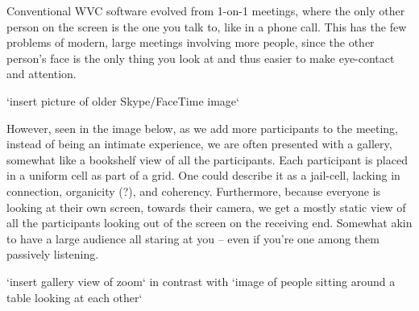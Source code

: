 \documentclass[10pt,letterpaper]{article}
\begin{document}
Conventional WVC software evolved from 1-on-1 meetings, where the only other person on the screen is the one you talk to, like in a phone call. This has the few problems of modern, large meetings involving more people, since the other person’s face is the only thing you look at and thus easier to make eye-contact and attention. 

`insert picture of older Skype/FaceTime image`

However, seen in the image below, as we add more participants to the meeting, instead of being an intimate experience, we are often presented with a gallery, somewhat like a bookshelf view of all the participants. Each participant is placed in a uniform cell as part of a grid. One could describe it as a jail-cell, lacking in connection, organicity (?), and coherency. Furthermore, because everyone is looking at their own screen, towards their camera, we get a mostly static view of all the participants looking out of the screen on the receiving end. Somewhat akin to have a large audience all staring at you -- even if you’re one among them passively listening.

`insert gallery view of zoom` in contrast with `image of people sitting around a table looking at each other`










\end{document}
